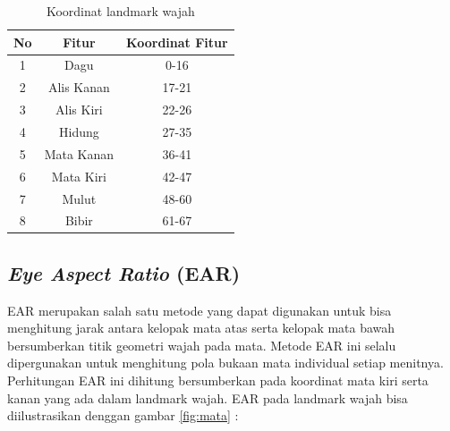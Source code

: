 \newpage
\begin{longtable}{|c|c|c|}
  \caption{Koordinat landmark wajah}
  \label{tb:LandmarkWajah}                                \\
  \hline
  \rowcolor[HTML]{C0C0C0}
  \textbf{No} & \textbf{Fitur} & \textbf{Koordinat Fitur} \\
  \hline

  1           & Dagu           & 0-16                     \\
  

  2           & Alis Kanan     & 17-21                    \\
  

  3           & Alis Kiri      & 22-26                    \\
  

  4           & Hidung         & 27-35                    \\
  

  5           & Mata Kanan     & 36-41                    \\
  

  6           & Mata Kiri      & 42-47                    \\
  

  7           & Mulut          & 48-60                    \\
  

  8           & Bibir          & 61-67                    \\
  \hline
\end{longtable}

\subsection{\emph{Eye Aspect Ratio} (EAR)}
EAR merupakan salah satu metode yang dapat digunakan untuk bisa menghitung jarak antara kelopak mata atas serta
kelopak mata bawah bersumberkan titik geometri wajah pada mata. Metode EAR ini selalu dipergunakan untuk menghitung
pola bukaan mata individual setiap menitnya. Perhitungan EAR ini dihitung bersumberkan pada koordinat mata kiri serta
kanan yang ada dalam landmark wajah. EAR pada landmark wajah bisa diilustrasikan denggan gambar \ref{fig:mata} :

